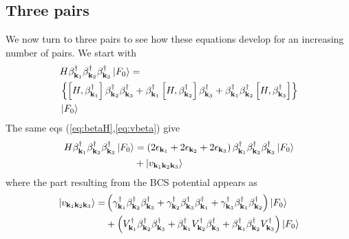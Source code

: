 \documentclass[aps,prb,superscriptaddress,twocolumn]{revtex4}
\begin{document}
\subsection{Three pairs}

We now turn to three pairs to see how these equations develop for an
increasing number of pairs. We start with 
\begin{equation}  \label{eq:SchThree}
\begin{split}
&H\beta^{\dagger}_{\mathbf{k} _1}\beta^{\dagger}_{\mathbf{k}
_2}\beta^{\dagger}_{\mathbf{k} _3}\left|F_0\right>   = \\
&\left\{\left[H,\beta^{\dagger}_{\mathbf{k} _1}\right]  \beta^{\dagger}_{%
\mathbf{k} _2}\beta^{\dagger}_{\mathbf{k} _3}+\beta^{\dagger}_{\mathbf{k} _1}%
\left[H,\beta^{\dagger}_{\mathbf{k} _2}\right]  \beta^{\dagger}_{\mathbf{k}
_3}+\beta^{\dagger}_{\mathbf{k} _1}\beta^{\dagger}_{\mathbf{k} _2}\left[%
H,\beta^{\dagger}_{\mathbf{k} _3}\right]  \right\}  \\
&\left|F_0\right>   \\
\end{split}%
\end{equation}
The same eqs (\ref{eq:betaH},\ref{eq:vbeta}) give 
\begin{equation}  \label{eq:SchThree2}
\begin{split}
H\beta^{\dagger}_{\mathbf{k} _1}\beta^{\dagger}_{\mathbf{k}
_2}\beta^{\dagger}_{\mathbf{k} _3}\left|F_0\right>   &=\left(2\epsilon_{%
\mathbf{k} _1}+2\epsilon_{\mathbf{k} _2}+2\epsilon_{\mathbf{k} _3}\right)
\beta^{\dagger}_{\mathbf{k} _1}\beta^{\dagger}_{\mathbf{k}
_2}\beta^{\dagger}_{\mathbf{k} _3}\left|F_0\right>   \\
&+\left|v_{\mathbf{k} _1\mathbf{k} _2\mathbf{k} _3}\right> 
\end{split}%
\end{equation}
where the part resulting from the BCS potential appears as 
\begin{equation}  \label{eq:vThree}
\begin{split}
\left|v_{\mathbf{k} _1\mathbf{k} _2\mathbf{k} _3}\right> =
&\left(\gamma^{\dagger}_{\mathbf{k} _1}\beta^{\dagger}_{\mathbf{k}
_2}\beta^{\dagger}_{\mathbf{k} _3}+\gamma^{\dagger}_{\mathbf{k}
_2}\beta^{\dagger}_{\mathbf{k} _3}\beta^{\dagger}_{\mathbf{k}
_1}+\gamma^{\dagger}_{\mathbf{k} _3}\beta^{\dagger}_{\mathbf{k}
_1}\beta^{\dagger}_{\mathbf{k} _2}\right) \left|F_0\right>   \\
&+\left(V^{\dagger}_{\mathbf{k} _1}\beta^{\dagger}_{\mathbf{k}
_2}\beta^{\dagger}_{\mathbf{k} _3}+\beta^{\dagger}_{\mathbf{k}
_1}V^{\dagger}_{\mathbf{k} _2}\beta^{\dagger}_{\mathbf{k} _3}+\beta^{%
\dagger}_{\mathbf{k} _1}\beta^{\dagger}_{\mathbf{k} _2}V^{\dagger}_{\mathbf{k%
} _3}\right) \left|F_0\right>  
\end{split}%
\end{equation}
\end{document}
